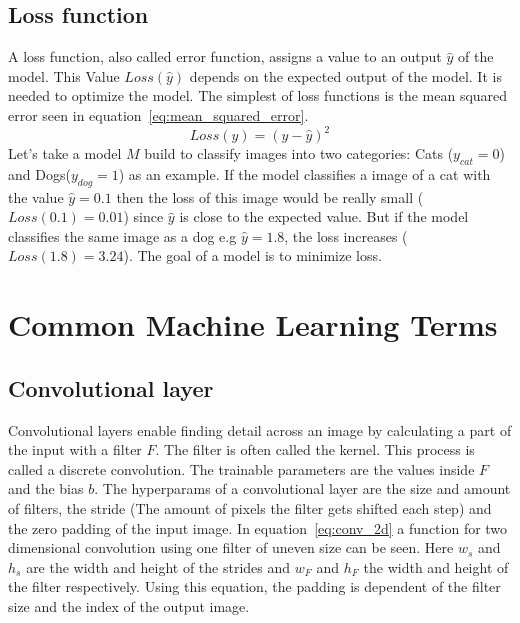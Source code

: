 \documentclass{article}
\begin{document}
\subsection{Loss function}
A loss function, also called error function, assigns a value to an output $\hat{y}$ of the model. This Value $Loss(\hat{y})$ depends on the expected output of the model. It is needed to optimize the model. The simplest of loss functions is the mean squared error seen in equation~\ref{eq:mean_squared_error}. 
\begin{equation}
    \label{eq:mean_squared_error}
    Loss(y) = (y-\hat{y})^2
\end{equation}
Let's take a model $M$ build to classify images into two categories: Cats ($y_{cat}=0$) and Dogs($y_{dog}=1$) as an example. If the model classifies a image of a cat with the value $\hat{y}=0.1$ then the loss of this image would be really small ($Loss(0.1)=0.01$) since $\hat{y}$ is close to the expected value. But if the model classifies the same image as a dog e.g $\hat{y}=1.8$, the loss increases ($Loss(1.8)=3.24$). The goal of a model is to minimize loss. 

\section{Common Machine Learning Terms}
\subsection{Convolutional layer}
\label{ref:conv_2d}
Convolutional layers enable finding detail across an image by calculating a part of the input with a filter $F$. The filter is often called the kernel. This process is called a discrete convolution. 
The trainable parameters are the values inside $F$ and the bias $b$. The \glspl{hyperparam} of a convolutional layer are the size and amount of filters, the stride (The amount of pixels the filter gets shifted each step) and the zero padding of the input image. \autocite{gu_recent_2017} 
In equation~\ref{eq:conv_2d} a function for two dimensional convolution using one filter of uneven size can be seen. Here $w_s$ and $h_s$ are the width and height of the strides and $w_F$ and $h_F$ the width and height of the filter respectively. Using this equation, the padding is dependent of the filter size and the index of the output image. 
\end{document}
